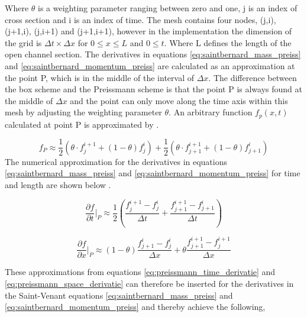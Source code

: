 Where $\theta$ is a weighting parameter ranging between zero and one, j is an index of cross section and i is an index of time. The mesh contains four nodes, (j,i), (j+1,i), (j,i+1) and (j+1,i+1), however in the implementation the dimension of the grid is $\Delta t \times \Delta x$ for $0 \leq x \leq L$ and $0\leq t$. Where L defines the length of the open channel section. The derivatives in equations \ref{eq:saintbernard_mass_preiss} and \ref{eq:saintbernard_momentum_preiss} are calculated as an approximation at the point P, which is in the middle of the interval of $\Delta x$.%
 The difference between the box scheme and the Preissmann scheme is that the point P is always found at the middle of $\Delta x$ and the point can only move along the time axis within this mesh by adjusting the weighting parameter $\theta$. %
 An arbitrary function $f_p(x,t)$ calculated at point P is approximated by \cite{numerical_modeling}.

\begin{equation}\label{eq:approximated_function}
    f_P \approx \frac{1}{2} (\theta \cdot f_j^{i+1}+(1-\theta)f_j^i)+\frac{1}{2}(\theta\cdot f_{j+1}^{i+1}+(1-\theta)f_{j+1}^i)
\end{equation}
The numerical approximation for the derivatives in equations \ref{eq:saintbernard_mass_preiss} and \ref{eq:saintbernard_momentum_preiss} for time and length are shown below \cite{numerical_modeling}.

\begin{equation}\label{eq:preissmann_time_derivatie}
    \frac{\partial f}{\partial t}\bigg \rvert_P \approx \frac{1}{2}\left(\frac{f_j^{i+1}-f_j^i}{\Delta t}+\frac{f_{j+1}^{i+1}-f_{j+1}^i}{\Delta t}\right)
\end{equation}

\begin{equation}\label{eq:preissmann_space_derivatie}
    \frac{\partial f}{\partial x}\bigg \rvert_P \approx (1-\theta)\frac{f_{j+1}^i-f_{j}^i}{\Delta x}+\theta \frac{f_{j+1}^{i+1}-f_{j}^{i+1}}{\Delta x}
\end{equation}

These approximations from equations \ref{eq:preissmann_time_derivatie} and \ref{eq:preissmann_space_derivatie} can therefore be inserted for the derivatives in the Saint-Venant equations \ref{eq:saintbernard_mass_preiss} and \ref{eq:saintbernard_momentum_preiss} and thereby achieve the following,

